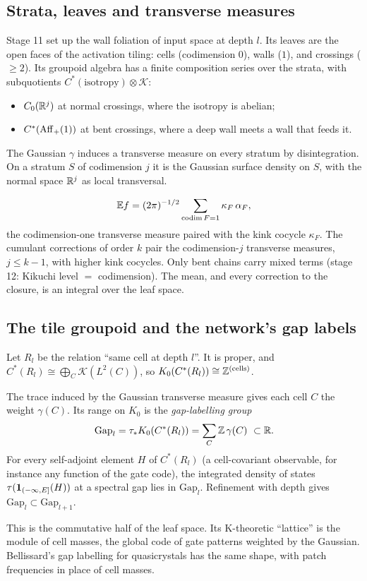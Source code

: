 \label{sec:groupoid}
\subsection{Strata, leaves and transverse measures}
Stage 11 set up the wall foliation of input space at depth $l$. Its leaves are the open faces of the activation tiling: cells
(codimension $0$), walls ($1$), and crossings ($\ge2$). Its groupoid algebra has a finite composition series over the strata, with
subquotients $C^*(\text{isotropy})\otimes\mathcal K$:
\begin{itemize}[leftmargin=*]
\item $C_0(\mathbb R^j)$ at normal crossings, where the isotropy is abelian;
\item $C^*(\mathrm{Aff}_+(1))$ at bent crossings, where a deep wall meets a wall that feeds it.
\end{itemize}
The Gaussian $\gamma$ induces a transverse measure on every stratum by disintegration. On a stratum $S$ of codimension $j$ it is the
Gaussian surface density on $S$, with the normal space $\mathbb R^j$ as local transversal.
\begin{proposition}\label{prop:leafint}
\[
\mathbb E f=(2\pi)^{-1/2}\sum_{\mathrm{codim}\,F=1}\kappa_F\,\alpha_F ,
\]
the codimension-one transverse measure paired with the kink cocycle $\kappa_F$.
The cumulant corrections of order $k$ pair the codimension-$j$ transverse measures, $j\le k-1$, with higher kink cocycles. Only bent
chains carry mixed terms (stage 12: Kikuchi level $=$ codimension). The mean, and every correction to the closure, is an integral over
the leaf space.
\end{proposition}

\subsection{The tile groupoid and the network's gap labels}
Let $R_l$ be the relation ``same cell at depth $l$''. It is proper, and $C^*(R_l)\cong\bigoplus_C\mathcal K(L^2(C))$, so $K_0(C^*(R_l))\cong\mathbb Z^{(\text{cells})}$.
\begin{proposition}\label{prop:gap}
The trace induced by the Gaussian transverse measure gives each cell $C$ the weight $\gamma(C)$. Its range on $K_0$ is the
\emph{gap-labelling group}
\[
\mathrm{Gap}_l=\tau_*K_0(C^*(R_l))=\sum_C\Z\,\gamma(C)\ \subset\R .
\]
For every self-adjoint element $H$ of $C^*(R_l)$ (a cell-covariant observable, for instance any function of the gate code), the
integrated density of states $\tau(\mathbf 1_{(-\infty,E]}(H))$ at a spectral gap lies in $\mathrm{Gap}_l$. Refinement with depth gives
$\mathrm{Gap}_l\subset\mathrm{Gap}_{l+1}$.
\end{proposition}
This is the commutative half of the leaf space. Its K-theoretic ``lattice'' is the module of cell masses, the global code of gate
patterns weighted by the Gaussian. Bellissard's gap labelling for quasicrystals has the same shape, with patch frequencies in place
of cell masses.

